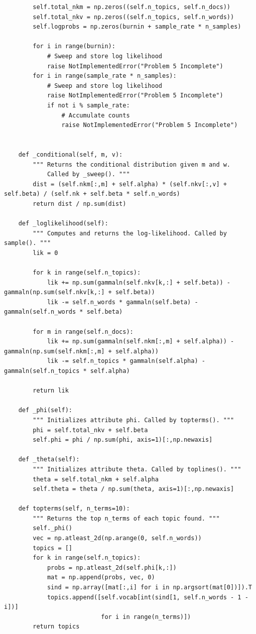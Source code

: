 \begin{lstlisting}
        self.total_nkm = np.zeros((self.n_topics, self.n_docs))
        self.total_nkv = np.zeros((self.n_topics, self.n_words))
        self.logprobs = np.zeros(burnin + sample_rate * n_samples)
        
        for i in range(burnin):
            # Sweep and store log likelihood
            raise NotImplementedError("Problem 5 Incomplete")
        for i in range(sample_rate * n_samples):
            # Sweep and store log likelihood
            raise NotImplementedError("Problem 5 Incomplete")
            if not i % sample_rate:
                # Accumulate counts
                raise NotImplementedError("Problem 5 Incomplete")

                
    def _conditional(self, m, v):
        """ Returns the conditional distribution given m and w.
            Called by _sweep(). """
        dist = (self.nkm[:,m] + self.alpha) * (self.nkv[:,v] + self.beta) / (self.nk + self.beta * self.n_words)
        return dist / np.sum(dist)

    def _loglikelihood(self):
        """ Computes and returns the log-likelihood. Called by sample(). """
        lik = 0

        for k in range(self.n_topics):
            lik += np.sum(gammaln(self.nkv[k,:] + self.beta)) - gammaln(np.sum(self.nkv[k,:] + self.beta))
            lik -= self.n_words * gammaln(self.beta) - gammaln(self.n_words * self.beta)

        for m in range(self.n_docs):
            lik += np.sum(gammaln(self.nkm[:,m] + self.alpha)) - gammaln(np.sum(self.nkm[:,m] + self.alpha))
            lik -= self.n_topics * gammaln(self.alpha) - gammaln(self.n_topics * self.alpha)

        return lik
    
    def _phi(self):
        """ Initializes attribute phi. Called by topterms(). """
        phi = self.total_nkv + self.beta
        self.phi = phi / np.sum(phi, axis=1)[:,np.newaxis]

    def _theta(self):
        """ Initializes attribute theta. Called by toplines(). """
        theta = self.total_nkm + self.alpha
        self.theta = theta / np.sum(theta, axis=1)[:,np.newaxis]

    def topterms(self, n_terms=10):
        """ Returns the top n_terms of each topic found. """
        self._phi()
        vec = np.atleast_2d(np.arange(0, self.n_words))
        topics = []
        for k in range(self.n_topics):
            probs = np.atleast_2d(self.phi[k,:])
            mat = np.append(probs, vec, 0)
            sind = np.array([mat[:,i] for i in np.argsort(mat[0])]).T
            topics.append([self.vocab[int(sind[1, self.n_words - 1 - i])] 
                           for i in range(n_terms)])
        return topics


\end{lstlisting}
